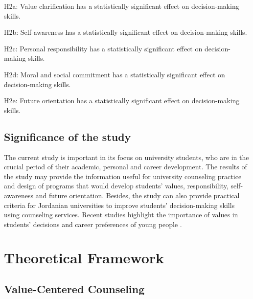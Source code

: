 \documentclass[10pt]{NSP1}
\begin{document}
H2a: Value clarification has a statistically significant effect on decision-making skills.

H2b: Self-awareness has a statistically significant effect on decision-making skills.

H2c: Personal responsibility has a statistically significant effect on decision-making skills.

H2d: Moral and social commitment has a statistically significant effect on decision-making skills.

H2e: Future orientation has a statistically significant effect on decision-making skills.

\subsection{Significance of the study}

The current study is important in its focus on university students, who are in the crucial period of their academic, personal and career development. The results of the study may provide the information useful for university counseling practice and design of programs that would develop students' values, responsibility, self-awareness and future orientation. Besides, the study can also provide practical criteria for Jordanian universities to improve students' decision-making skills using counseling services. Recent studies highlight the importance of values in students' decisions and career preferences of young people \cite{ref8,ref9}.

\section{Theoretical Framework}

\subsection{Value-Centered Counseling}
\end{document}
